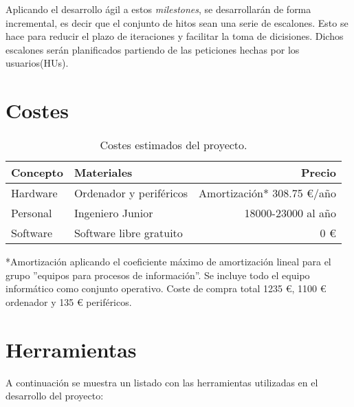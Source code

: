 Aplicando el desarrollo ágil a estos \textit{milestones}, se desarrollarán de forma incremental, es decir que el conjunto de hitos sean una serie de escalones. Esto se hace para reducir el plazo de iteraciones y facilitar la toma de dicisiones. Dichos escalones serán planificados partiendo de las peticiones hechas por los usuarios(HUs).


\section{Costes}
\begin{table}[H]
	\centering
	\begin{tabular}{| l | l | r |}
        \hline
        \textbf{Concepto} & \textbf{Materiales} & \textbf{Precio} \\
        \hline
        Hardware	& Ordenador y periféricos & Amortización* 308.75 €/año\\
        Personal 	& Ingeniero Junior	& 18000-23000 al año \\
        Software 	& Software libre gratuito & 0 € \\
        \hline
        \hline
	\end{tabular}
	\caption{Costes estimados del proyecto.}
\end{table}

*Amortización aplicando el coeficiente máximo de amortización lineal para el grupo ''equipos para procesos de información''\cite{amortizacion}. Se incluye todo el equipo informático como conjunto operativo. Coste de compra total 1235 €, 1100 € ordenador y 135 € periféricos.


\section{Herramientas}
A continuación se muestra un listado con las herramientas utilizadas en el desarrollo del proyecto: